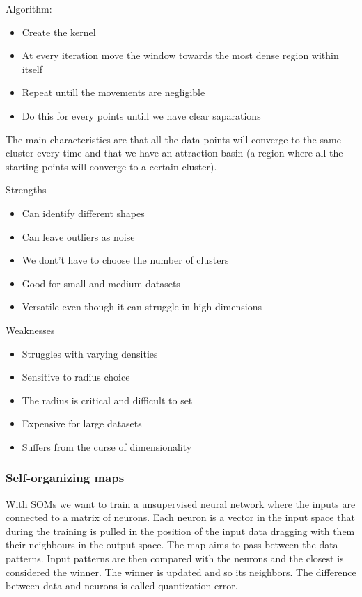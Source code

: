 \vspace{10pt}

Algorithm:
\begin{itemize}
    \item Create the kernel
    \item At every iteration move the window towards the most dense region within itself
    \item Repeat untill the movements are negligible
    \item Do this for every points untill we have clear saparations
\end{itemize}

The main characteristics are that all the data points will converge to the same cluster every time and that we have an attraction basin (a region where all the starting points will converge to a certain cluster).

\vspace{10pt}

Strengths

\begin{itemize}
    \item Can identify different shapes
    \item Can leave outliers as noise
    \item We dont't have to choose the number of clusters
    \item Good for small and medium datasets
    \item Versatile even though it can struggle in high dimensions
\end{itemize}

Weaknesses

\begin{itemize}
    \item Struggles with varying densities
    \item Sensitive to radius choice
    \item The radius is critical and difficult to set
    \item Expensive for large datasets
    \item Suffers from the curse of dimensionality
\end{itemize}

\subsubsection{Self-organizing maps}

With SOMs we want to train a unsupervised neural network where the inputs are connected to a matrix of neurons. Each neuron is a vector in the input space that during the training is pulled in the position of the input data dragging with them their neighbours in the output space. The map aims to pass between the data patterns. Input patterns are then compared with the neurons and the closest is considered the winner. The winner is updated and so its neighbors. The difference between data and neurons is called quantization error.

